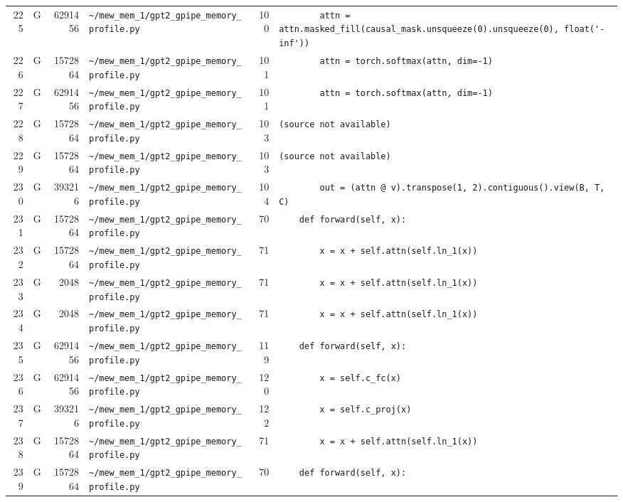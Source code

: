 \documentclass{article}
\begin{document}
\begin{longtable}{r l r p{6.5cm} r p{7.0cm}}
225 & G & 6291456 & \lstinline|~/mew_mem_1/gpt2_gpipe_memory_profile.py| & 100 & \lstinline|        attn = attn.masked_fill(causal_mask.unsqueeze(0).unsqueeze(0), float('-inf'))| \\
226 & G & 1572864 & \lstinline|~/mew_mem_1/gpt2_gpipe_memory_profile.py| & 101 & \lstinline|        attn = torch.softmax(attn, dim=-1)| \\
227 & G & 6291456 & \lstinline|~/mew_mem_1/gpt2_gpipe_memory_profile.py| & 101 & \lstinline|        attn = torch.softmax(attn, dim=-1)| \\
228 & G & 1572864 & \lstinline|~/mew_mem_1/gpt2_gpipe_memory_profile.py| & 103 & \lstinline|(source not available)| \\
229 & G & 1572864 & \lstinline|~/mew_mem_1/gpt2_gpipe_memory_profile.py| & 103 & \lstinline|(source not available)| \\
230 & G & 393216 & \lstinline|~/mew_mem_1/gpt2_gpipe_memory_profile.py| & 104 & \lstinline|        out = (attn @ v).transpose(1, 2).contiguous().view(B, T, C)| \\
231 & G & 1572864 & \lstinline|~/mew_mem_1/gpt2_gpipe_memory_profile.py| & 70 & \lstinline|    def forward(self, x):| \\
232 & G & 1572864 & \lstinline|~/mew_mem_1/gpt2_gpipe_memory_profile.py| & 71 & \lstinline|        x = x + self.attn(self.ln_1(x))| \\
233 & G & 2048 & \lstinline|~/mew_mem_1/gpt2_gpipe_memory_profile.py| & 71 & \lstinline|        x = x + self.attn(self.ln_1(x))| \\
234 & G & 2048 & \lstinline|~/mew_mem_1/gpt2_gpipe_memory_profile.py| & 71 & \lstinline|        x = x + self.attn(self.ln_1(x))| \\
235 & G & 6291456 & \lstinline|~/mew_mem_1/gpt2_gpipe_memory_profile.py| & 119 & \lstinline|    def forward(self, x):| \\
236 & G & 6291456 & \lstinline|~/mew_mem_1/gpt2_gpipe_memory_profile.py| & 120 & \lstinline|        x = self.c_fc(x)| \\
237 & G & 393216 & \lstinline|~/mew_mem_1/gpt2_gpipe_memory_profile.py| & 122 & \lstinline|        x = self.c_proj(x)| \\
238 & G & 1572864 & \lstinline|~/mew_mem_1/gpt2_gpipe_memory_profile.py| & 71 & \lstinline|        x = x + self.attn(self.ln_1(x))| \\
239 & G & 1572864 & \lstinline|~/mew_mem_1/gpt2_gpipe_memory_profile.py| & 70 & \lstinline|    def forward(self, x):| \\

\end{longtable}
\end{document}
